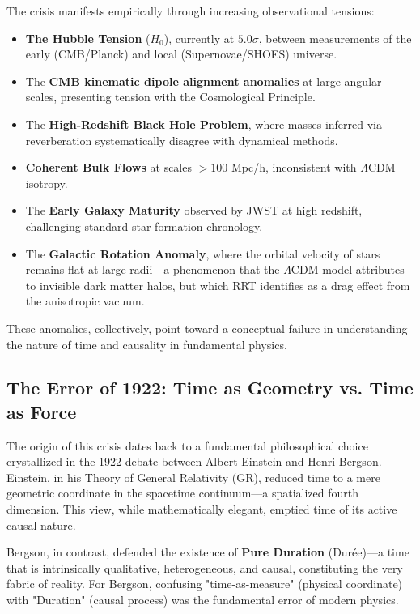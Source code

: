 \documentclass[12pt,a4paper]{article}
\begin{document}
The crisis manifests empirically through increasing observational tensions:
\begin{itemize}
    \item \textbf{The Hubble Tension} ($H_0$), currently at $5.0\sigma$, between measurements of the early (CMB/Planck) and local (Supernovae/SHOES) universe.
    \item The \textbf{CMB kinematic dipole alignment anomalies} at large angular scales, presenting tension with the Cosmological Principle.
    \item The \textbf{High-Redshift Black Hole Problem}, where masses inferred via reverberation systematically disagree with dynamical methods.
    \item \textbf{Coherent Bulk Flows} at scales $> 100$ Mpc/h, inconsistent with $\Lambda$CDM isotropy.
    \item The \textbf{Early Galaxy Maturity} observed by JWST at high redshift, challenging standard star formation chronology.
    \item The \textbf{Galactic Rotation Anomaly}, where the orbital velocity of stars remains flat at large radii—a phenomenon that the $\Lambda$CDM model attributes to invisible dark matter halos, but which RRT identifies as a drag effect from the anisotropic vacuum.
\end{itemize}

These anomalies, collectively, point toward a conceptual failure in understanding the nature of time and causality in fundamental physics.

\subsection{The Error of 1922: Time as Geometry vs. Time as Force}
The origin of this crisis dates back to a fundamental philosophical choice crystallized in the 1922 debate between Albert Einstein and Henri Bergson. Einstein, in his Theory of General Relativity (GR), reduced time to a mere geometric coordinate in the spacetime continuum—a spatialized fourth dimension. This view, while mathematically elegant, emptied time of its active causal nature.

Bergson, in contrast, defended the existence of \textbf{Pure Duration} (Durée)—a time that is intrinsically qualitative, heterogeneous, and causal, constituting the very fabric of reality. For Bergson, confusing "time-as-measure" (physical coordinate) with "Duration" (causal process) was the fundamental error of modern physics.
\end{document}
